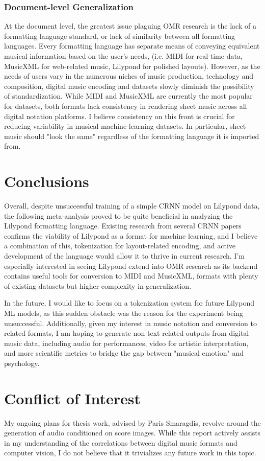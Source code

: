\documentclass[nonacm, sigconf]{acmart}
\begin{document}
\subsubsection{Document-level Generalization}
At the document level, the greatest issue plaguing OMR research is the lack of a formatting language standard, or lack of similarity between all formatting languages.
Every formatting language has separate means of conveying equivalent musical information based on the user's needs, (i.e. MIDI for real-time data, MusicXML for web-related music, Lilypond for polished layouts).
However, as the needs of users vary in the numerous niches of music production, technology and composition, digital music encoding and datasets slowly diminish the possibility of standardization.
While MIDI and MusicXML are currently the most popular for datasets, both formats lack consistency in rendering sheet music across all digital notation platforms.
I believe consistency on this front is crucial for reducing variability in musical machine learning datasets. In particular, sheet music should "look the same" regardless of the formatting language it is imported from. 

\section{Conclusions}
Overall, despite unsuccessful training of a simple CRNN model on Lilypond data, the following meta-analysis proved to be quite beneficial in analyzing the Lilypond formatting language.
Existing research from several CRNN papers confirms the viability of Lilypond as a format for machine learning, and I believe a combination of this, tokenization for layout-related encoding, 
and active development of the language would allow it to thrive in current research. 
I'm especially interested in seeing Lilypond extend into OMR research as its backend contains useful tools for conversion to MIDI and MusicXML, formats with plenty of existing datasets but higher complexity in generalization.

In the future, I would like to focus on a tokenization system for future Lilypond ML models, as this sudden obstacle was the reason for the experiment being unsuccessful.
Additionally, given my interest in music notation and conversion to related formats, I am hoping to generate non-text-related outputs from digital music data, including audio for performances,
video for artistic interpretation, and more scientific metrics to bridge the gap between "musical emotion" and psychology.

\section{Conflict of Interest}

My ongoing plans for thesis work, advised by Paris Smaragdis, revolve around the generation of audio conditioned on score images. 
While this report actively assists in my understanding of the correlations between digital music formats and computer vision, I do not believe that it trivializes any future work in this topic.



\end{document}
